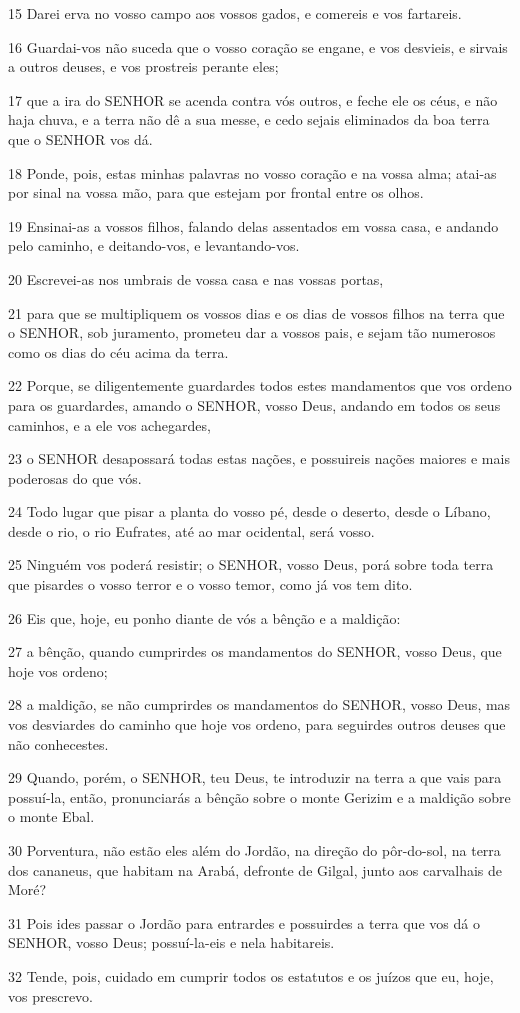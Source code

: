 \par 15 Darei erva no vosso campo aos vossos gados, e comereis e vos fartareis.
\par 16 Guardai-vos não suceda que o vosso coração se engane, e vos desvieis, e sirvais a outros deuses, e vos prostreis perante eles;
\par 17 que a ira do SENHOR se acenda contra vós outros, e feche ele os céus, e não haja chuva, e a terra não dê a sua messe, e cedo sejais eliminados da boa terra que o SENHOR vos dá.
\par 18 Ponde, pois, estas minhas palavras no vosso coração e na vossa alma; atai-as por sinal na vossa mão, para que estejam por frontal entre os olhos.
\par 19 Ensinai-as a vossos filhos, falando delas assentados em vossa casa, e andando pelo caminho, e deitando-vos, e levantando-vos.
\par 20 Escrevei-as nos umbrais de vossa casa e nas vossas portas,
\par 21 para que se multipliquem os vossos dias e os dias de vossos filhos na terra que o SENHOR, sob juramento, prometeu dar a vossos pais, e sejam tão numerosos como os dias do céu acima da terra.
\par 22 Porque, se diligentemente guardardes todos estes mandamentos que vos ordeno para os guardardes, amando o SENHOR, vosso Deus, andando em todos os seus caminhos, e a ele vos achegardes,
\par 23 o SENHOR desapossará todas estas nações, e possuireis nações maiores e mais poderosas do que vós.
\par 24 Todo lugar que pisar a planta do vosso pé, desde o deserto, desde o Líbano, desde o rio, o rio Eufrates, até ao mar ocidental, será vosso.
\par 25 Ninguém vos poderá resistir; o SENHOR, vosso Deus, porá sobre toda terra que pisardes o vosso terror e o vosso temor, como já vos tem dito.
\par 26 Eis que, hoje, eu ponho diante de vós a bênção e a maldição:
\par 27 a bênção, quando cumprirdes os mandamentos do SENHOR, vosso Deus, que hoje vos ordeno;
\par 28 a maldição, se não cumprirdes os mandamentos do SENHOR, vosso Deus, mas vos desviardes do caminho que hoje vos ordeno, para seguirdes outros deuses que não conhecestes.
\par 29 Quando, porém, o SENHOR, teu Deus, te introduzir na terra a que vais para possuí-la, então, pronunciarás a bênção sobre o monte Gerizim e a maldição sobre o monte Ebal.
\par 30 Porventura, não estão eles além do Jordão, na direção do pôr-do-sol, na terra dos cananeus, que habitam na Arabá, defronte de Gilgal, junto aos carvalhais de Moré?
\par 31 Pois ides passar o Jordão para entrardes e possuirdes a terra que vos dá o SENHOR, vosso Deus; possuí-la-eis e nela habitareis.
\par 32 Tende, pois, cuidado em cumprir todos os estatutos e os juízos que eu, hoje, vos prescrevo.


